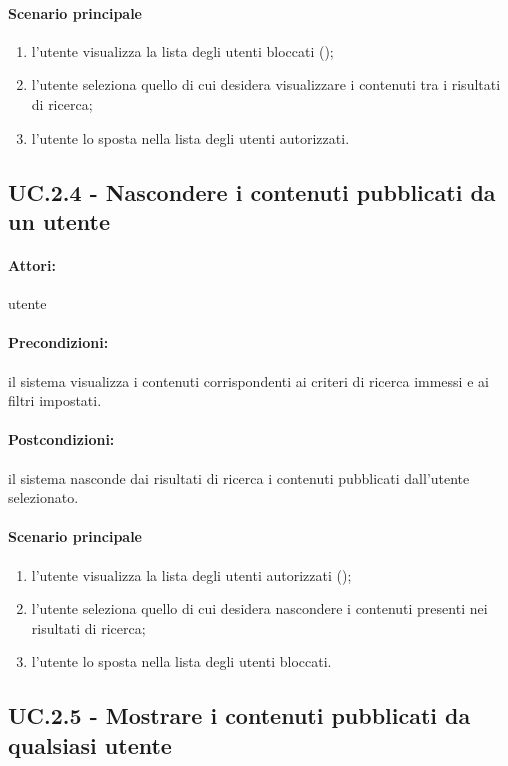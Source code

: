 \documentclass[10pt,a4paper,headinclude,footinclude,hidelinks]{scrreprt} %
\begin{document}
	\paragraph{Scenario principale}
	\begin{enumerate}
	\item l'utente visualizza la lista degli utenti bloccati ();
	\item l'utente seleziona quello di cui desidera visualizzare i contenuti tra i risultati di ricerca;
	\item l'utente lo sposta nella lista degli utenti autorizzati.
	\end{enumerate}

	\subsection[UC.2.4]{UC.2.4 - Nascondere i contenuti pubblicati da un utente}
	\label{ch:stage:ar:uc:2_4}
	\paragraph{Attori:} utente
	\paragraph{Precondizioni:} il sistema visualizza i contenuti corrispondenti ai criteri di ricerca immessi e ai filtri impostati.
	\paragraph{Postcondizioni:} il sistema nasconde dai risultati di ricerca i contenuti pubblicati dall'utente selezionato.
	\paragraph{Scenario principale}
	\begin{enumerate}
	\item l'utente visualizza la lista degli utenti autorizzati ();
	\item l'utente seleziona quello di cui desidera nascondere i contenuti presenti nei risultati di ricerca;
	\item l'utente lo sposta nella lista degli utenti bloccati.
	\end{enumerate}

	\subsection[UC.2.5]{UC.2.5 - Mostrare i contenuti pubblicati da qualsiasi utente}
	\label{ch:stage:ar:uc:2_5}
\end{document}
